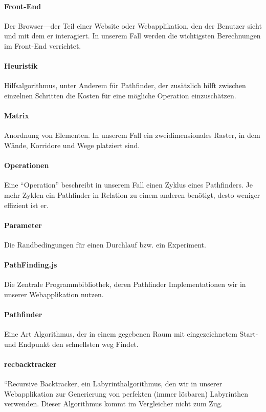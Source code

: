 \documentclass[12pt,a4paper,german]{report}
\begin{document}
\paragraph{Front-End} Der Browser---der Teil einer Website oder Webapplikation, den der Benutzer sieht und mit dem er interagiert. In unserem Fall werden die wichtigsten Berechnungen im Front-End verrichtet.
\paragraph{Heuristik} Hilfsalgorithmus, unter Anderem für Pathfinder, der zusätzlich hilft zwischen einzelnen Schritten die Kosten für eine mögliche Operation einzuschätzen.
\paragraph{Matrix} Anordnung von Elementen. In unserem Fall ein zweidimensionales Raster, in dem Wände, Korridore und Wege platziert sind.
\paragraph{Operationen} Eine ``Operation'' beschreibt in unserem Fall einen Zyklus eines Pathfinders. Je mehr Zyklen ein Pathfinder in Relation zu einem anderen benötigt, desto weniger effizient ist er.
\paragraph{Parameter} Die Randbedingungen für einen Durchlauf bzw. ein Experiment.
\paragraph{PathFinding.js} Die Zentrale Programmbibliothek, deren Pathfinder Implementationen wir in unserer Webapplikation nutzen.
\paragraph{Pathfinder} Eine Art Algorithmus, der in einem gegebenen Raum mit eingezeichnetem Start- und Endpunkt den schnellsten weg Findet.
\paragraph{recbacktracker} ``Recursive Backtracker, ein Labyrinthalgorithmus, den wir in unserer Webapplikation zur Generierung von perfekten (immer lösbaren) Labyrinthen verwenden. Dieser Algorithmus kommt im Vergleicher nicht zum Zug.




\clearpage



\listoffigures
\end{document}

